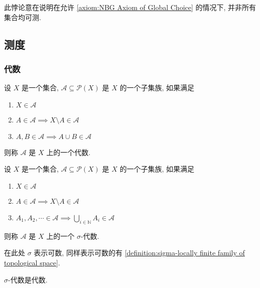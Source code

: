 此悖论意在说明在允许 \ref{axiom:NBG Axiom of Global Choice} 的情况下, 并非所有集合均可测.

\subsection{测度}

\subsubsection{代数}

\begin{definition}[代数]
    设 \(X\) 是一个集合, \(\mathcal{A} \subseteq \mathcal{P} (X)\) 是 \(X\) 的一个子集族, 如果满足

    \begin{enumerate}
        \item \(X \in \mathcal{A}\)
        \item \(A \in \mathcal{A} \implies X \setminus A \in \mathcal{A}\)
        \item \(A, B \in \mathcal{A} \implies A \cup B \in \mathcal{A}\)
    \end{enumerate}

    则称 \(\mathcal{A}\) 是 \(X\) 上的一个代数.
\end{definition}

\begin{definition}[\(\sigma\) - 代数]
    设 \(X\) 是一个集合, \(\mathcal{A} \subseteq \mathcal{P} (X)\) 是 \(X\) 的一个子集族, 如果满足

    \begin{enumerate}
        \item \(X \in \mathcal{A}\)
        \item \(A \in \mathcal{A} \implies X \setminus A \in \mathcal{A}\)
        \item \(A_1, A_2, \cdots \in \mathcal{A} \implies \bigcup_{i \in \mathbb{N}} A_i \in \mathcal{A}\)
    \end{enumerate}

    则称 \(\mathcal{A}\) 是 \(X\) 上的一个 \(\sigma\)-代数.
\end{definition}

\begin{remark}
    在此处 \(\sigma\) 表示可数, 同样表示可数的有 \ref{definition:sigma-locally finite family of topological space}.
\end{remark}

\begin{corollary}
    \(\sigma\)-代数是代数.
\end{corollary}

